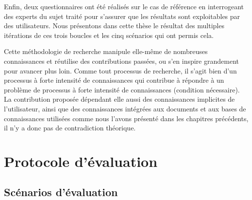 
Enfin, deux questionnaires ont été réalisés sur le cas de référence en interrogeant des experts du sujet traité pour s'assurer que les résultats sont exploitables par des utilisateurs.
Nous présentons dans cette thèse le résultat des multiples itérations de ces trois boucles et les cinq scénarios qui ont permis cela.

\bigskip

Cette méthodologie de recherche manipule elle-même de nombreuses connaissances et réutilise des contributions passées, ou s'en inspire grandement pour avancer plus loin.
Comme tout processus de recherche, il s'agit bien d'un processus à forte intensité de connaissances qui contribue à répondre à un problème de processus à forte intensité de connaissances (condition nécessaire).
La contribution proposée dépendant elle aussi des connaissances implicites de l'utilisateur, ainsi que des connaissances intégrées aux documents et aux bases de connaissances utilisées comme nous l'avons présenté dans les chapitres précédents, il n'y a donc pas de contradiction théorique.




\clearpage %
\newpage   %


\section{Protocole d'évaluation}
\label{section:Evaluation:ProtocoleEvaluation}


\subsection{Scénarios d'évaluation}
\label{subsection:Evaluation:ProtocoleEvaluation:ScenariosEvaluation}

